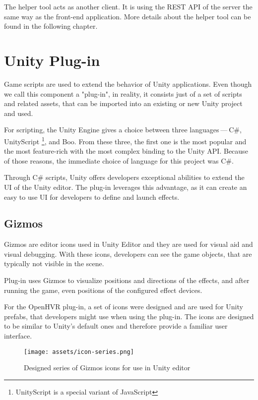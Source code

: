 The helper tool acts as another client. It is using the REST API of the server
the same way as the front-end application. More details about the helper tool
can be found in the following chapter.


\hypertarget{x-unity-plug-in}{\section{Unity Plug-in}}
Game scripts are used to extend the behavior of Unity applications. Even though
we call this component a "plug-in", in reality, it consists just of a
set of scripts and related assets, that can be imported into an existing
or new Unity project and used.


For scripting, the Unity Engine gives a choice between three languages — C\#, UnityScript \footnote{UnityScript is a special variant of JavaScript}, and
Boo. From these three, the first one is the most popular and the most
feature-rich with the most complex binding to the Unity API. \cite{unityblog}
Because of those reasons, the immediate choice of language for this
project was C\#.


Through C\# scripts, Unity offers developers exceptional abilities to extend
the UI of the Unity editor. The plug-in leverages this advantage, as it can
create an easy to use UI for developers to define and launch effects.


\hypertarget{x-gizmos}{\subsection{Gizmos}}
Gizmos are editor icons used in Unity Editor and they are used for
visual aid and visual debugging. \cite{gizmos}
With these icons, developers can see the game objects, that are
typically not visible in the scene.


Plug-in uses Gizmos to visualize positions and directions of the
effects, and after running the game, even positions of the configured
effect devices.


For the OpenHVR plug-in, a set of icons were designed and are used for
Unity prefabs, that developers might use when using the plug-in. The icons
are designed to be similar to Unity’s default ones and therefore provide
a familiar user interface.


\begin{figure}[h]{}
\centering\texttt{[image: assets/icon-series.png]}
\caption{Designed series of Gizmos icons for use in Unity editor}

\end{figure}

